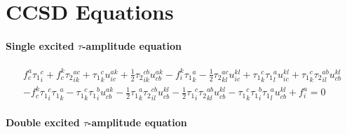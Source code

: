 \section{CCSD Equations}
\label{app:ccsd_equations}

\paragraph{Single excited $\tau$-amplitude equation}

\begin{gather*}
f^{a}_{c} {\tau_1}^{c}_{i} 
+ f^{k}_{c} {\tau_2}^{ac}_{ik} 
+ {\tau_1}^{c}_{k} u^{ak}_{ic}
+ \frac{1}{2}{\tau_2}^{cb}_{ik} u^{ak}_{cb} 
- f^{k}_{i} {\tau_1}^{a}_{k}
- \frac{1}{2}{\tau_2}^{ac}_{kl} u^{kl}_{ic}
+ {\tau_1}^{c}_{k} {\tau_1}^{a}_{l} u^{kl}_{ic} 
 + {\tau_1}^{c}_{k} {\tau_2}^{ab}_{il} u^{kl}_{cb} \\
- f^{k}_{c} {\tau_1}^{c}_{i} {\tau_1}^{a}_{k}
- {\tau_1}^{c}_{k} {\tau_1}^{b}_{i} u^{ak}_{cb}
- \frac{1}{2}{\tau_1}^{a}_{k} {\tau_2}^{cb}_{il} u^{kl}_{cb}
- \frac{1}{2}{\tau_1}^{c}_{i} {\tau_2}^{ab}_{kl} u^{kl}_{cb}
- {\tau_1}^{c}_{k} {\tau_1}^{b}_{i} {\tau_1}^{a}_{l} u^{kl}_{cb}
+ f^{a}_{i}
= 0
\end{gather*}

\paragraph{Double excited $\tau$-amplitude equation}

